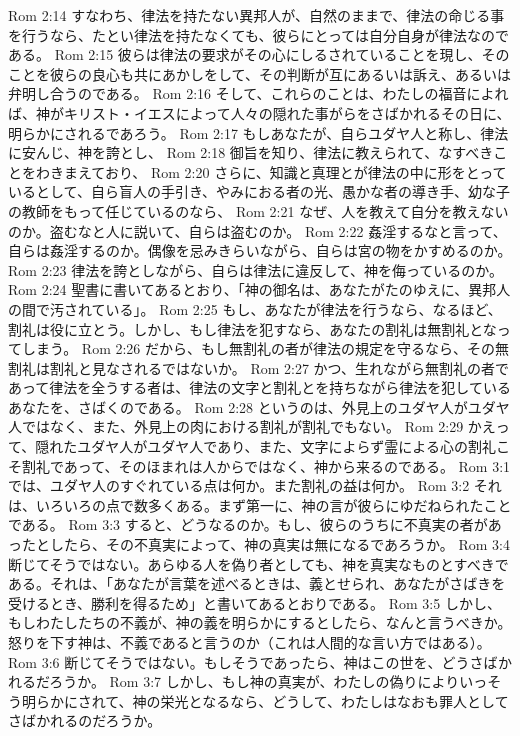Rom 2:14  すなわち、律法を持たない異邦人が、自然のままで、律法の命じる事を行うなら、たとい律法を持たなくても、彼らにとっては自分自身が律法なのである。
Rom 2:15  彼らは律法の要求がその心にしるされていることを現し、そのことを彼らの良心も共にあかしをして、その判断が互にあるいは訴え、あるいは弁明し合うのである。
Rom 2:16  そして、これらのことは、わたしの福音によれば、神がキリスト・イエスによって人々の隠れた事がらをさばかれるその日に、明らかにされるであろう。
Rom 2:17  もしあなたが、自らユダヤ人と称し、律法に安んじ、神を誇とし、
Rom 2:18  御旨を知り、律法に教えられて、なすべきことをわきまえており、
Rom 2:20  さらに、知識と真理とが律法の中に形をとっているとして、自ら盲人の手引き、やみにおる者の光、愚かな者の導き手、幼な子の教師をもって任じているのなら、
Rom 2:21  なぜ、人を教えて自分を教えないのか。盗むなと人に説いて、自らは盗むのか。
Rom 2:22  姦淫するなと言って、自らは姦淫するのか。偶像を忌みきらいながら、自らは宮の物をかすめるのか。
Rom 2:23  律法を誇としながら、自らは律法に違反して、神を侮っているのか。
Rom 2:24  聖書に書いてあるとおり、「神の御名は、あなたがたのゆえに、異邦人の間で汚されている」。
Rom 2:25  もし、あなたが律法を行うなら、なるほど、割礼は役に立とう。しかし、もし律法を犯すなら、あなたの割礼は無割礼となってしまう。
Rom 2:26  だから、もし無割礼の者が律法の規定を守るなら、その無割礼は割礼と見なされるではないか。
Rom 2:27  かつ、生れながら無割礼の者であって律法を全うする者は、律法の文字と割礼とを持ちながら律法を犯しているあなたを、さばくのである。
Rom 2:28  というのは、外見上のユダヤ人がユダヤ人ではなく、また、外見上の肉における割礼が割礼でもない。
Rom 2:29  かえって、隠れたユダヤ人がユダヤ人であり、また、文字によらず霊による心の割礼こそ割礼であって、そのほまれは人からではなく、神から来るのである。
Rom 3:1  では、ユダヤ人のすぐれている点は何か。また割礼の益は何か。
Rom 3:2  それは、いろいろの点で数多くある。まず第一に、神の言が彼らにゆだねられたことである。
Rom 3:3  すると、どうなるのか。もし、彼らのうちに不真実の者があったとしたら、その不真実によって、神の真実は無になるであろうか。
Rom 3:4  断じてそうではない。あらゆる人を偽り者としても、神を真実なものとすべきである。それは、「あなたが言葉を述べるときは、義とせられ、あなたがさばきを受けるとき、勝利を得るため」と書いてあるとおりである。
Rom 3:5  しかし、もしわたしたちの不義が、神の義を明らかにするとしたら、なんと言うべきか。怒りを下す神は、不義であると言うのか（これは人間的な言い方ではある）。
Rom 3:6  断じてそうではない。もしそうであったら、神はこの世を、どうさばかれるだろうか。
Rom 3:7  しかし、もし神の真実が、わたしの偽りによりいっそう明らかにされて、神の栄光となるなら、どうして、わたしはなおも罪人としてさばかれるのだろうか。
